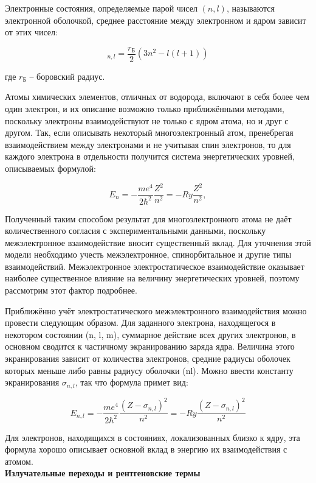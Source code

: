 \documentclass[a4paper, 12pt]{article}%
\begin{document}
		Электронные состояния,  определяемые парой чисел $(n,  l)$,  называются электронной оболочкой,  среднее расстояние между электронном и ядром зависит от этих чисел:

		\[< r >_{n,  l} = \frac{r_{\text{Б}}}{2} (3n^2 - l(l + 1))\]
			
где $r_{\text{Б}}$ – боровский радиус. 

		Атомы химических элементов,  отличных от водорода,  включают в себя более чем один электрон,  и их описание возможно только приближёнными методами,  поскольку электроны взаимодействуют не только с ядром атома,  но и друг с другом.   Так,  если описывать некоторый многоэлектронный атом,  пренебрегая взаимодействием между электронами и не учитывая спин электронов,  то для каждого электрона в отдельности получится система энергетических уровней,  описываемых формулой:

		\[E_n = - \frac{me^4}{2\hbar^2} \frac{Z^2}{n^2} = -Ry \frac{Z^2}{n^2}, \]
			
		Полученный таким способом результат для многоэлектронного атома не даёт количественного согласия с экспериментальными данными,  поскольку межэлектронное взаимодействие вносит существенный вклад.  Для уточнения этой модели необходимо учесть межэлектронное,  спинорбитальное и другие типы взаимодействий.  Межэлектронное электростатическое взаимодействие оказывает наиболее существенное влияние на величину энергетических уровней,  поэтому рассмотрим этот фактор подробнее.

		Приближённо учёт электростатического межэлектронного взаимодействия можно провести следующим образом.  Для заданного электрона,  находящегося в некотором состоянии (n,  l,  m),  суммарное действие всех других электронов,  в основном сводится к частичному экранированию заряда ядра.  Величина этого экранирования зависит от количества электронов,  средние радиусы оболочек которых меньше либо равны радиусу оболочки (nl).  Можно ввести константу экранирования $\sigma_{n, l}$,  так что формула примет вид:

		\[E_{n,  l} = -\frac{me^4}{2\hbar^2} \frac{(Z - \sigma_{n, l})^2}{n^2} = -Ry \frac{(Z - \sigma_{n, l})^2}{n^2}\]
			
		Для электронов,  находящихся в состояниях,  локализованных близко к ядру,  эта формула хорошо описывает основной вклад в энергию их взаимодействия с атомом.\\
				
		\textbf{Излучательные переходы и рентгеновские термы}\\
				
\end{document}
